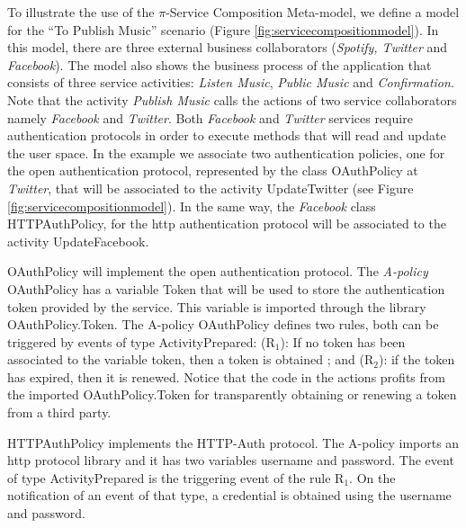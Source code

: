 \begin{example}\label{ex:toPublicMusic}
To illustrate the use of the $\pi$-Service Composition Meta-model, we define a model for the ``To Publish Music'' scenario (Figure \ref{fig:servicecompositionmodel}). 
In this model, there are three external business collaborators ({\em Spotify, Twitter} and {\em Facebook}).
The model also shows the business process of the application that consists of three service activities: {\em Listen Music}, {\em Public Music} and {\em Confirmation}. 
Note that  the activity {\em Publish Music} calls the actions of two service collaborators namely {\em Facebook} and {\em Twitter}.
Both {\em Facebook} and {\em Twitter} services require authentication protocols in order to execute methods that will read and update the user space. 
In the example we  associate two authentication policies, one for the open authentication protocol, represented by the class {\sf\small OAuthPolicy} at {\em Twitter}, that will be associated to the activity  {\sf\small UpdateTwitter} (see Figure \ref{fig:servicecompositionmodel}). 
In the same way, the {\em Facebook} class {\sf\small HTTPAuthPolicy}, for the http authentication protocol will be associated to the activity {\sf\small UpdateFacebook}.

{\sf\small OAuthPolicy} will implement the open authentication protocol.
The {\em A-policy} {\sf\small OAuthPolicy} has a variable {\sf\small Token} that will be used to store the authentication token provided by the service.
This variable is imported through the library {\sf\small OAuthPolicy.Token}. 
The A-policy {\sf\small OAuthPolicy} defines two rules, both can be triggered by events of type {\sf\small ActivityPrepared}: (R$_1$): If no token has been associated to the variable {\sf\small token}, then a token is obtained ; and (R$_2$): if the token has expired, then it is renewed. 
Notice that the code in the actions profits from the imported {\sf\small OAuthPolicy.Token} for transparently obtaining or renewing a token from a third party.

{\sf\small HTTPAuthPolicy} implements the HTTP-Auth protocol. 
The A-policy imports an http protocol library and it has two variables {\sf\small username} and {\sf\small password}.  
The event of type {\sf\small ActivityPrepared} is the triggering event of the rule {\sf\small R$_1$}. 
On the notification of an event of that type, a credential is obtained using the username and password. 
\hfill\openbox
\end{example}

